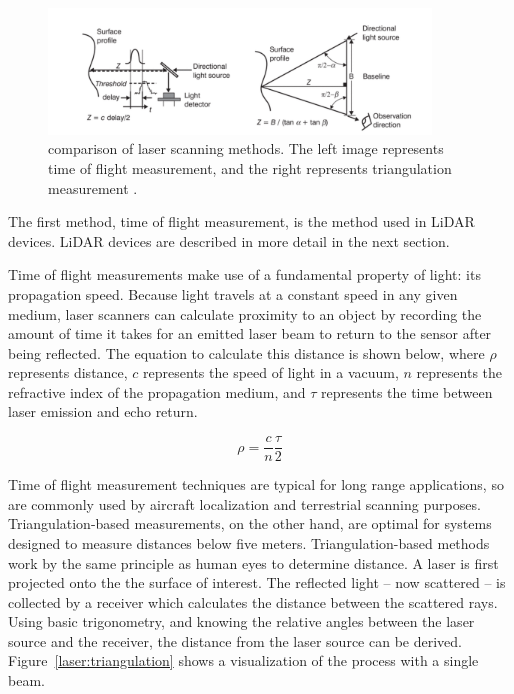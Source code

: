 \documentclass[12pt]{drexelthesis}
\begin{document}
\begin{figure}
	\centering
		\includegraphics[width=4in]{instruments/laser-scanning-methods.png}
		\caption[Comparison of laser scanning methods]{\centering comparison of laser scanning methods. The left image represents time of flight measurement, and the right represents triangulation measurement \cite{basic-measurement-principles}.}
	\label{laserscanners}
\end{figure}

The first method, time of flight measurement, is the method used in LiDAR devices. LiDAR devices are described in more detail in the next section.

Time of flight measurements make use of a fundamental property of light: its propagation speed. Because light travels at a constant speed in any given medium, laser scanners can calculate proximity to an object by recording the amount of time it takes for an emitted laser beam to return to the sensor after being reflected. The equation to calculate this distance is shown below, where $\rho$ represents distance, $c$ represents the speed of light in a vacuum, $n$ represents the refractive index of the propagation medium, and $\tau$ represents the time between laser emission and echo return.

\begin{equation}
	\rho = \frac{c}{n} \frac{\tau}{2}
\end{equation}

Time of flight measurement techniques are typical for long range applications, so are commonly used by aircraft localization and terrestrial scanning purposes. Triangulation-based measurements, on the other hand, are optimal for systems designed to measure distances below five meters. Triangulation-based methods work by the same principle as human eyes to determine distance.   A laser is first projected onto the the surface of interest. The reflected light -- now scattered -- is collected by a receiver which calculates the distance between the scattered rays. Using basic trigonometry, and knowing the relative angles between the laser source and the receiver, the distance from the laser source can be derived. Figure~\ref{laser:triangulation} shows a visualization of the process with a single beam.
\end{document}
